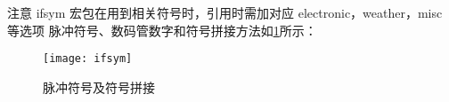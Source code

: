 注意 ifsym 宏包在用到相关符号时，引用时需加对应 electronic，weather，misc 等选项
脉冲符号、数码管数字和符号拼接方法如\ref{ifsym}所示：\\

\begin{figure}[htbp]
  \centering
  \texttt{[image: ifsym]}\\
  \caption{脉冲符号及符号拼接}\label{ifsym}
\end{figure}

